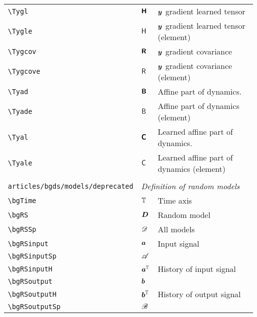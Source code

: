 \begin{longtable}{lll}
 {\color[rgb]{0.5,0.5,0.5}\texttt{\textbackslash Tygl}} & $\boldsymbol{{\mathsf{H}}}$ &  $\boldsymbol{y}$ gradient learned tensor \\ 
 {\color[rgb]{0.5,0.5,0.5}\texttt{\textbackslash Tygle}} & ${\mathsf{H}}$ &  $\boldsymbol{y}$ gradient learned tensor (element)\\ 
 {\color[rgb]{0.5,0.5,0.5}\texttt{\textbackslash Tygcov}} & $\boldsymbol{{\mathsf{R}}}$ &  $\boldsymbol{y}$ gradient covariance\\ 
 {\color[rgb]{0.5,0.5,0.5}\texttt{\textbackslash Tygcove}} & ${\mathsf{R}}$ &  $\boldsymbol{y}$ gradient covariance (element)\\ 
 {\color[rgb]{0.5,0.5,0.5}\texttt{\textbackslash Tyad}} & $\boldsymbol{{\mathsf{B}}}$ &  Affine part of dynamics.\\ 
 {\color[rgb]{0.5,0.5,0.5}\texttt{\textbackslash Tyade}} & ${\mathsf{B}}$ &  Affine part of dynamics (element)\\ 
 {\color[rgb]{0.5,0.5,0.5}\texttt{\textbackslash Tyal}} & $\boldsymbol{{\mathsf{C}}}$ &  Learned affine part of dynamics.\\ 
 {\color[rgb]{0.5,0.5,0.5}\texttt{\textbackslash Tyale}} & ${\mathsf{C}}$ &  Learned affine part of dynamics (element)\\ 
  &  & \\ 
 {\color[rgb]{0.5,0.5,0.5}\texttt{articles/bgds/models/deprecated}} & \multicolumn{2}{l}{\emph{Definition of random models}}\\ 
 \hline
{\color[rgb]{0.5,0.5,0.5}\texttt{\textbackslash bgTime}} & $\mathbb{T}$ &  Time axis\\ 
 {\color[rgb]{0.5,0.5,0.5}\texttt{\textbackslash bgRS}} & $\boldsymbol{D}$ &  Random model\\ 
 {\color[rgb]{0.5,0.5,0.5}\texttt{\textbackslash bgRSSp}} & $\mathscr{D}$ &  All models\\ 
 {\color[rgb]{0.5,0.5,0.5}\texttt{\textbackslash bgRSinput}} & $\boldsymbol{a}$ &  Input signal\\ 
 {\color[rgb]{0.5,0.5,0.5}\texttt{\textbackslash bgRSinputSp}} & $\mathscr{A}$ &  \\ 
 {\color[rgb]{0.5,0.5,0.5}\texttt{\textbackslash bgRSinputH}} & $\boldsymbol{a}^{\mathbb{T}}$ &  History of input signal\\ 
 {\color[rgb]{0.5,0.5,0.5}\texttt{\textbackslash bgRSoutput}} & $\boldsymbol{b}$ & \\ 
 {\color[rgb]{0.5,0.5,0.5}\texttt{\textbackslash bgRSoutputH}} & $\boldsymbol{b}^{\mathbb{T}}$ &  History of output signal\\ 
 {\color[rgb]{0.5,0.5,0.5}\texttt{\textbackslash bgRSoutputSp}} & $\mathscr{B}$ &  \\ 

\end{longtable}
